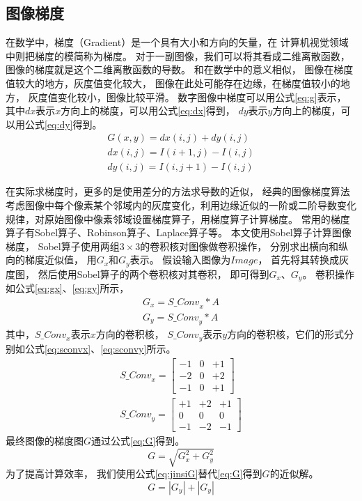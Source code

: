 \subsection{图像梯度}
\label{subsection:tidu}

在数学中，梯度（Gradient）是一个具有大小和方向的矢量，在
计算机视觉领域中则把梯度的模简称为梯度。
对于一副图像，我们可以将其看成二维离散函数，图像的梯度就是这个二维离散函数的导数。
和在数学中的意义相似，
图像在梯度值较大的地方，灰度值变化较大，
图像在此处可能存在边缘，在梯度值较小的地方，
灰度值变化较小，图像比较平滑。
数字图像中梯度可以用公式\eqref{eq:g}表示，
其中$dx$表示$x$方向上的梯度，可以用公式\eqref{eq:dx}得到，
$dy$表示$y$方向上的梯度，可以用公式\eqref{eq:dy}得到。
\begin{gather}
G(x,y)=dx(i,j)+dy(i,j)\label{eq:g}\\
dx(i,j)=I(i+1,j)-I(i,j)\label{eq:dx}\\
dy(i,j)=I(i,j+1)-I(i,j)\label{eq:dy}
\end{gather}

在实际求梯度时，更多的是使用差分的方法求导数的近似，
经典的图像梯度算法考虑图像中每个像素某个邻域内的灰度变化，利用边缘近似的一阶或二阶导数变化规律，对原始图像中像素邻域设置梯度算子，用梯度算子计算梯度。
常用的梯度算子有Sobel算子\cite{russ2016image}、Robinson算子\cite{russ2016image}、Laplace算子\cite{russ2016image}等。
本文使用Sobel算子计算图像梯度，
Sobel算子使用两组$3\times 3$的卷积核对图像做卷积操作，
分别求出横向和纵向的梯度近似值，
用$G_x$和$G_y$表示。
假设输入图像为$Image$，
首先将其转换成灰度图，
然后使用Sobel算子的两个卷积核对其卷积，
即可得到$G_x$、$G_y$。
卷积操作如公式\eqref{eq:gx}、\eqref{eq:gy}所示，
\begin{gather}
G_x={S\_Conv}_x*A\label{eq:gx}\\
G_y={S\_Conv}_y*A\label{eq:gy}
\end{gather}
其中，${S\_Conv}_x$表示$x$方向的卷积核，
${S\_Conv}_y$表示$y$方向的卷积核，它们的形式分别如公式\eqref{eq:sconvx}、\eqref{eq:sconvy}所示。
\begin{gather}
{S\_Conv}_x=\begin{bmatrix} -1 & 0 & +1 \\ -2 & 0 & +2\\-1 & 0 & +1\end{bmatrix}  \label{eq:sconvx}\\
{S\_Conv}_y=\begin{bmatrix} +1 & +2 & +1 \\ 0 & 0 & 0\\-1 & -2 & -1\end{bmatrix}  \label{eq:sconvy}
\end{gather}
最终图像的梯度图$G$通过公式\eqref{eq:G}得到。
\begin{equation}
G=\sqrt{G_x^2+G_y^2} \label{eq:G}
\end{equation}
为了提高计算效率，
我们使用公式\eqref{eq:jinsiG}替代\eqref{eq:G}得到$G$的近似解。
\begin{equation}
G= \left| {G}_{y} \right|+ \left| {G}_{y} \right|
\label{eq:jinsiG}
\end{equation}

